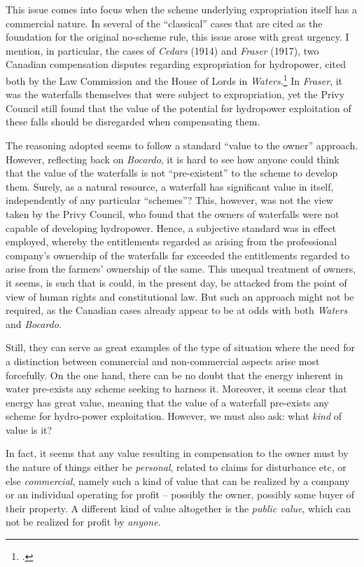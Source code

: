 This issue comes into focus when the scheme underlying expropriation itself has a commercial nature. In several of the ``classical'' cases that are cited as the foundation for the original no-scheme rule, this issue arose with great urgency. I mention, in particular, the cases of \emph{Cedars} (1914) and \emph{Fraser} (1917), two Canadian compensation disputes regarding expropriation for hydropower, cited both by the Law Commission and the House of Lords in \emph{Waters}.\footnote{\cite{cedars14,fraser17}.} In \emph{Fraser}, it was the waterfalls themselves that were subject to expropriation, yet the Privy Council still found that the value of the potential for hydropower exploitation of these falls should be disregarded when compensating them.

The reasoning adopted seems to follow a standard ``value to the owner'' approach. However, reflecting back on {\it Bocardo}, it is hard to see how anyone could think that the value of the waterfalls is not ``pre-existent'' to the scheme to develop them. Surely, as a natural resource, a waterfall has significant value in itself, independently of any particular ``schemes''? This, however, was not the view taken by the Privy Council, who found that the owners of waterfalls were not capable of developing hydropower. Hence, a subjective standard was in effect employed, whereby the entitlements regarded as arising from the professional company's  ownership of the waterfalls far exceeded the entitlements regarded to arise from the farmers' ownership of the same. This unequal treatment of owners, it seems, is such that is could, in the present day, be attacked from the point of view of human rights and constitutional law. But such an approach might not be required, as the Canadian cases already appear to be at odds with both {\it Waters} and {\it Bocardo}.

Still, they can serve as great examples of the type of situation where the need for a distinction between commercial and non-commercial aspects arise most forcefully. On the one hand, there can be no doubt that the energy inherent in water pre-exists any scheme seeking to harness it. Moreover, it seems clear that energy has great value, meaning that the value of a waterfall pre-exists any scheme for hydro-power exploitation. However, we must also ask: what \emph{kind} of value is it?

In fact, it seems that any value resulting in compensation to the owner must by the nature of things either be \emph{personal}, related to claims for disturbance etc, or else \emph{commercial}, namely such a kind of value that can be realized by a company or an individual operating for profit -- possibly the owner, possibly some buyer of their property. A different kind of value altogether is the \emph{public value}, which can not be realized for profit by \emph{anyone}. 


